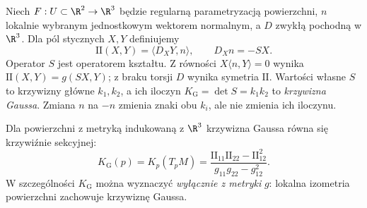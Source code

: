 \begin{definicja}
\label{def:druga-forma-podstawowa}
Niech $F:U\subset\R^2\to\R^3$ będzie regularną
parametryzacją powierzchni, $n$ lokalnie wybranym
jednostkowym wektorem normalnym, a $D$ zwykłą pochodną
w $\R^3$. Dla pól stycznych $X,Y$ definiujemy
\[
 \mathrm{II}(X,Y)=\langle D_XY,n\rangle,
 \qquad D_Xn=-S X.
\]
Operator $S$ jest operatorem kształtu. Z równości
$X\langle n,Y\rangle=0$ wynika
$\mathrm{II}(X,Y)=g(SX,Y)$; z braku torsji $D$
wynika symetria $\mathrm{II}$. Wartości własne $S$
to krzywizny główne $k_1,k_2$, a ich iloczyn
$K_{\mathrm G}=\det S=k_1k_2$ to \emph{krzywizna Gaussa}.
Zmiana $n$ na $-n$ zmienia znaki obu $k_i$,
ale nie zmienia ich iloczynu.
\end{definicja}

\begin{twierdzenie}
\label{thm:egregium}
Dla powierzchni z metryką indukowaną z $\R^3$
krzywizna Gaussa równa się krzywiźnie sekcyjnej:
\begin{equation}\label{eq:egregium}
 K_{\mathrm G}(p)=K_p(T_pM)
 =\frac{\mathrm{II}_{11}\mathrm{II}_{22}
                  -\mathrm{II}_{12}^{2}}
             {g_{11}g_{22}-g_{12}^{2}}.
\end{equation}
W szczególności $K_{\mathrm G}$ można wyznaczyć
\emph{wyłącznie z metryki} $g$: lokalna izometria
powierzchni zachowuje krzywiznę Gaussa.
\end{twierdzenie}

